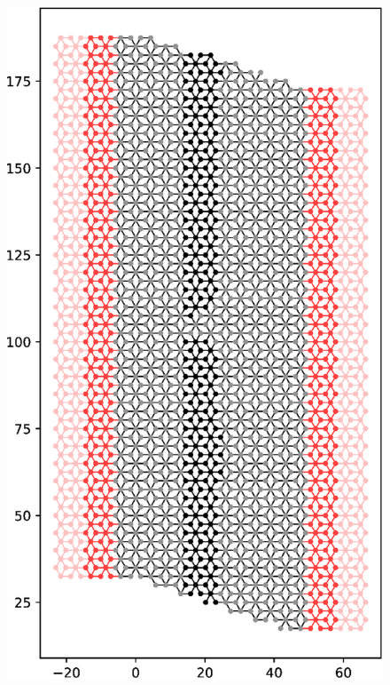 \begin{figure}[ht]
\centering
\begin{minipage}[b]{0.3\linewidth}
\centering
\includegraphics[width=\textwidth]{figure/numericalmodel/qpc-system}
\end{minipage}
\hspace{1.5cm}
\begin{minipage}[b]{0.3\linewidth}
\centering

\end{minipage}
\end{figure}

